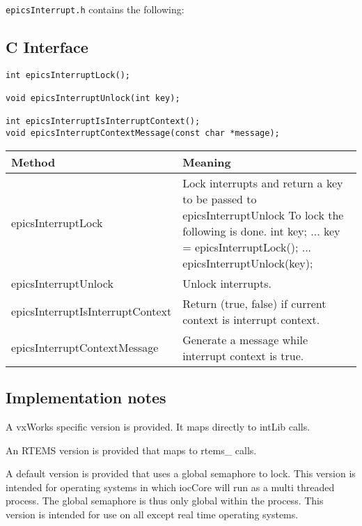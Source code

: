 \verb|epicsInterrupt.h| contains the following:

\subsection{C Interface}

\begin{verbatim}
int epicsInterruptLock();

void epicsInterruptUnlock(int key);

int epicsInterruptIsInterruptContext();
void epicsInterruptContextMessage(const char *message);
\end{verbatim}

\begin{center}
\begin{longtable}{p{1.97222in}p{3.66667in}}
\textbf{Method} & \textbf{Meaning}\\
\hline
epicsInterruptLock & Lock interrupts and return a key to be passed to epicsInterruptUnlock To lock the following is done.       int key;      ...      key = epicsInterruptLock();       ...       epicsInterruptUnlock(key);\\
epicsInterruptUnlock & Unlock interrupts.\\
epicsInterruptIsInterruptContext & Return (true, false) if current context is interrupt context.\\
epicsInterruptContextMessage & Generate a message while interrupt context is true.
\end{longtable}

\end{center}


\subsection{Implementation notes}

A vxWorks specific version is provided. It maps directly to intLib calls.

An RTEMS version is provided that maps to rtems\_ calls.

A default version is provided that uses a global semaphore to lock. This version is intended for operating systems in 
which iocCore will run as a multi threaded process. The global semaphore is thus only global within the process. This 
version is intended for use on all except real time operating systems.

